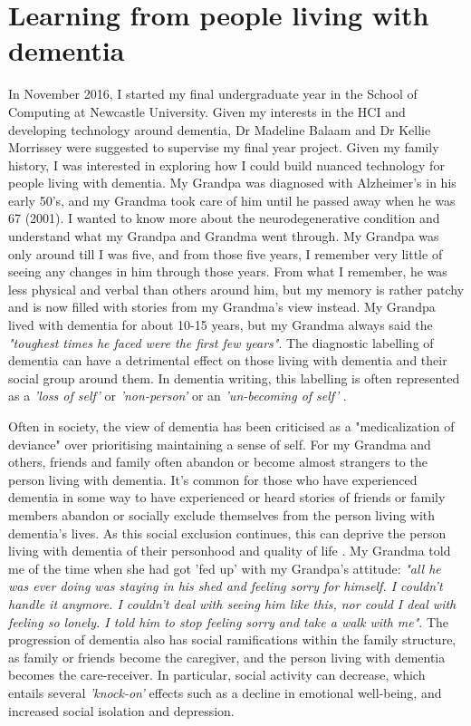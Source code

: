 \section{Learning from people living with dementia}
\label{Relationships:Learning}
In November 2016, I started my final undergraduate year in the School of Computing at Newcastle University. Given my interests in the HCI and developing technology around dementia, Dr Madeline Balaam and Dr Kellie Morrissey were suggested to supervise my final year project. Given my family history, I was interested in exploring how I could build nuanced technology for people living with dementia. My Grandpa was diagnosed with Alzheimer's in his early 50's, and my Grandma took care of him until he passed away when he was 67 (2001). I wanted to know more about the neurodegenerative condition and understand what my Grandpa and Grandma went through. My Grandpa was only around till I was five, and from those five years, I remember very little of seeing any changes in him through those years. From what I remember, he was less physical and verbal than others around him, but my memory is rather patchy and is now filled with stories from my Grandma's view instead. My Grandpa lived with dementia for about 10-15 years, but my Grandma always said the \textit{"toughest times he faced were the first few years"}. The diagnostic labelling of dementia can have a detrimental effect on those living with dementia and their social group around them. In dementia writing, this labelling is often represented as a \textit{'loss of self'} or \textit{'non-person'} or an \textit{'un-becoming of self'} \citep{fontana_alzheimers_1989,kontos_embodied_2005}. 

Often in society, the view of dementia has been criticised as a "medicalization of deviance" \citep{bond_medicalization_1992} over prioritising maintaining a sense of self. For my Grandma and others, friends and family often abandon or become almost strangers to the person living with dementia. It's common for those who have experienced dementia in some way to have experienced or heard stories of friends or family members abandon or socially exclude themselves from the person living with dementia's lives. As this social exclusion continues, this can deprive the person living with dementia of their personhood and quality of life \cite{taylor_recognition_2008}. My Grandma told me of the time when she had got 'fed up' with my Grandpa's attitude: \textit{"all he was ever doing was staying in his shed and feeling sorry for himself. I couldn't handle it anymore. I couldn't deal with seeing him like this, nor could I deal with feeling so lonely. I told him to stop feeling sorry and take a walk with me"}. The progression of dementia also has social ramifications within the family structure, as family or friends become the caregiver, and the person living with dementia becomes the care-receiver. In particular, social activity can decrease, which entails several \textit{'knock-on'} effects such as a decline in emotional well-being, and increased social isolation and depression. 

